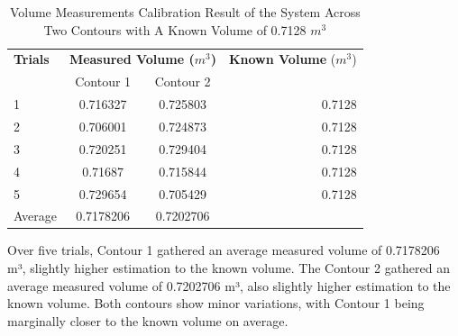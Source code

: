 \begin{enumerate}
	      \begin{table}[H]
		      \centering
		      \begin{threeparttable}
			      \caption{Volume Measurements Calibration Result of the System Across Two Contours with A Known Volume of 0.7128 $m^3$}
			      \label{table:test_case_2-3_results}
			      \begin{tabular}{l c c r}
				      \toprule
				      \textbf{Trials} & \multicolumn{2}{c}{\textbf{Measured Volume ($m^{3}$)}} & \textbf{Known Volume} ($m^{3}$)          \\
				      {}              & Contour 1                                              & Contour 2                       & {}     \\ \midrule
				      1               & 0.716327                                               & 0.725803                        & 0.7128 \\
				      2               & 0.706001                                               & 0.724873                        & 0.7128 \\
				      3               & 0.720251                                               & 0.729404                        & 0.7128 \\
				      4               & 0.71687                                                & 0.715844                        & 0.7128 \\
				      5               & 0.729654                                               & 0.705429                        & 0.7128 \\ \midrule
				      Average         & 0.7178206                                              & 0.7202706                       & {}     \\ \bottomrule
			      \end{tabular}
		      \end{threeparttable}
	      \end{table}


	      Over five trials, Contour 1 gathered an average measured volume of 0.7178206 m³, slightly higher estimation to the known volume. The Contour 2 gathered an average measured volume of 0.7202706 m³, also slightly higher estimation to the known volume. Both contours show minor variations, with Contour 1 being marginally closer to the known volume on average. \\



\end{enumerate}
